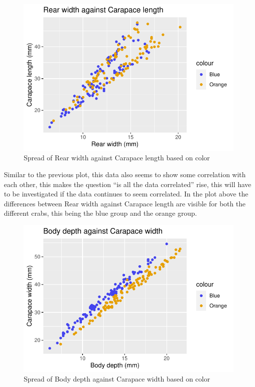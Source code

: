 \documentclass[
]{article}
\begin{document}
\begin{figure}[H]

{\centering \includegraphics{CrabProject_files/figure-latex/figure2-1} 

}

\caption{Spread of Rear width against Carapace length based on color}\label{fig:figure2}
\end{figure}

Similar to the previous plot, this data also seems to show some
correlation with each other, this makes the question ``is all the data
correlated'' rise, this will have to be investigated if the data
continues to seem correlated. In the plot above the differences between
Rear width against Carapace length are visible for both the different
crabs, this being the blue group and the orange group.

\newpage
\begin{figure}[H]

{\centering \includegraphics{CrabProject_files/figure-latex/figure3-1} 

}

\caption{Spread of Body depth against Carapace width based on color}\label{fig:figure3}
\end{figure}
\end{document}
